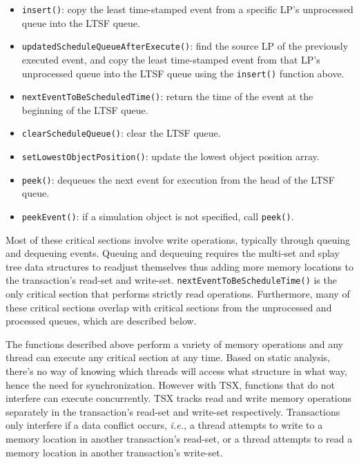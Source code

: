 \documentclass{sig-alternate}
\begin{document}
\begin{itemize}
    \item\texttt{insert()}: copy the least time-stamped event from a specific
        LP's unprocessed queue into the LTSF queue.
  \item\texttt{updatedScheduleQueueAfterExecute()}: find the source LP of the
      previously executed event, and copy the least time-stamped event from that
      LP's unprocessed queue into the LTSF queue using the \texttt{insert()}
      function above.
  \item\texttt{nextEventToBeScheduledTime()}: return the time of the event at the
    beginning of the LTSF queue.
  \item\texttt{clearScheduleQueue()}: clear the LTSF queue.
  \item\texttt{setLowestObjectPosition()}: update the lowest object position
      array. 
  \item\texttt{peek()}: dequeues the next event for execution from the head of
      the LTSF queue.
  \item\texttt{peekEvent()}: if a simulation object is not specified, call \texttt{peek()}. 
  \end{itemize}

Most of these critical sections involve write operations, typically through queuing and
dequeuing events.  Queuing and dequeuing requires the multi-set and splay tree data
structures to readjust themselves thus adding more memory locations to the transaction's
read-set and write-set.  \texttt{nextEventToBeScheduleTime()} is the only critical section
that performs strictly read operations.  Furthermore, many of these critical sections
overlap with critical sections from the unprocessed and processed queues, which are
described below.


The functions described above perform a variety of memory operations and any thread can
execute any critical section at any time.  Based on static analysis, there's no way of
knowing which threads will access what structure in what way, hence the need for
synchronization.  However with TSX, functions that do not interfere can execute
concurrently.  TSX tracks read and write memory operations separately in the transaction's
read-set and write-set respectively.  Transactions only interfere if a data conflict
occurs, \emph{i.e.,} a thread attempts to write to a memory location in another
transaction's read-set, or a thread attempts to read a memory location in another
transaction's write-set.
\end{document}
